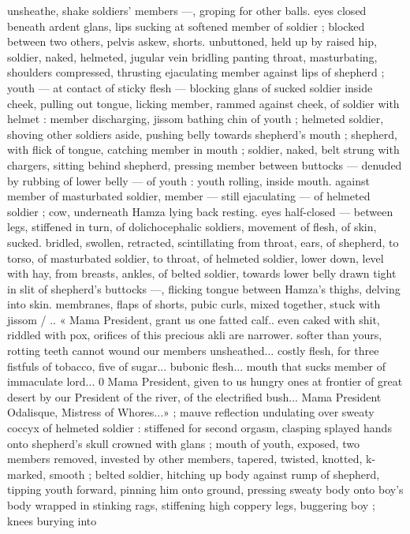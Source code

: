 unsheathe, shake soldiers’ members ---, groping for other balls.
eyes closed beneath ardent glans, lips sucking at softened member
of soldier ; blocked between two others, pelvis askew, shorts.
unbuttoned, held up by raised hip, soldier, naked, helmeted, jugular
vein bridling panting throat, masturbating, shoulders compressed,
thrusting ejaculating member against lips of shepherd ; youth --- at
contact of sticky flesh --- blocking glans of sucked soldier inside
cheek, pulling out tongue, licking member, rammed against cheek, of
soldier with helmet : member discharging, jissom bathing chin of
youth ; helmeted soldier, shoving other soldiers aside, pushing belly
towards shepherd's mouth ; shepherd, with flick of tongue, catching
member in mouth ; soldier, naked, belt strung with chargers, sitting
behind shepherd, pressing member between buttocks --- denuded
by rubbing of lower belly --- of youth : youth rolling, inside mouth.
against member of masturbated soldier, member --- still ejaculating
--- of helmeted soldier ; cow, underneath Hamza lying back resting.
eyes half-closed --- between legs, stiffened in turn, of
dolichocephalic soldiers, movement of flesh, of skin, sucked.
bridled, swollen, retracted, scintillating from throat, ears, of
shepherd, to torso, of masturbated soldier, to throat, of helmeted
soldier, lower down, level with hay, from breasts, ankles, of belted
soldier, towards lower belly drawn tight in slit of shepherd's buttocks
---, flicking tongue between Hamza’s thighs, delving into skin.
membranes, flaps of shorts, pubic curls, mixed together, stuck with
jissom / .. « Mama President, grant us one fatted calf.. even caked
with shit, riddled with pox, orifices of this precious akli are narrower.
softer than yours, rotting teeth cannot wound our members
unsheathed... costly flesh, for three fistfuls of tobacco, five of
sugar... bubonic flesh... mouth that sucks member of immaculate
lord... 0 Mama President, given to us hungry ones at frontier of great
desert by our President of the river, of the electrified bush... Mama
President Odalisque, Mistress of Whores...» ; mauve reflection
undulating over sweaty coccyx of helmeted soldier : stiffened for
second orgasm, clasping splayed hands onto shepherd's skull
crowned with glans ; mouth of youth, exposed, two members
removed, invested by other members, tapered, twisted, knotted,
k-marked, smooth ; belted soldier, hitching up body against rump
of shepherd, tipping youth forward, pinning him onto ground,
pressing sweaty body onto boy’s body wrapped in stinking rags,
stiffening high coppery legs, buggering boy ; knees burying into
